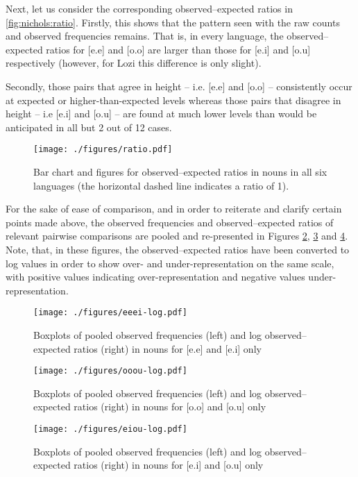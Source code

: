 \documentclass[output=paper]{langscibook}
\begin{document}
Next, let us consider the corresponding observed--expected ratios in \autoref{fig:nichols:ratio}. Firstly, this shows that the pattern seen with the raw counts and observed frequencies remains. That is, in every language, the observed--expected ratios for [e.e] and [o.o] are larger than those for [e.i] and [o.u] respectively (however, for Lozi this difference is only slight).

Secondly, those pairs that agree in height -- i.e. [e.e] and [o.o] -- consistently occur at expected or higher-than-expected levels whereas those pairs that disagree in height -- i.e [e.i] and [o.u] -- are found at much lower levels than would be anticipated in all but 2 out of 12 cases.

\begin{figure}
\caption{Bar chart and figures for observed--expected ratios in nouns in all six languages (the horizontal dashed line indicates a ratio of 1).}
\label{fig:nichols:ratio}
\texttt{[image: ./figures/ratio.pdf]}
\end{figure}

For the sake of ease of comparison, and in order to reiterate and clarify certain points made above, the observed frequencies and observed--expected ratios of relevant pairwise comparisons are pooled and re-presented in Figures \ref{fig:nichols:eeei}, \ref{fig:nichols:oou} and \ref{fig:nichols:eiou}. Note, that, in these figures, the observed--expected ratios have been converted to log values in order to show over- and under-representation on the same scale, with positive values indicating over-representation and negative values under-representation.

\begin{figure}[p]
\caption{Boxplots of pooled observed frequencies (left) and log observed--expected ratios (right) in nouns for [e.e] and [e.i] only}
\label{fig:nichols:eeei}
\texttt{[image: ./figures/eeei-log.pdf]}
\end{figure}

\begin{figure}[p]
\caption{Boxplots of pooled observed frequencies (left) and log observed--expected ratios (right) in nouns for [o.o] and [o.u] only}
\label{fig:nichols:oou}
\texttt{[image: ./figures/ooou-log.pdf]}
\end{figure}

\begin{figure}[p]
\caption{Boxplots of pooled observed frequencies (left) and log observed--expected ratios (right) in nouns for [e.i] and [o.u] only}
\label{fig:nichols:eiou}
\texttt{[image: ./figures/eiou-log.pdf]}
\end{figure}
\end{document}
